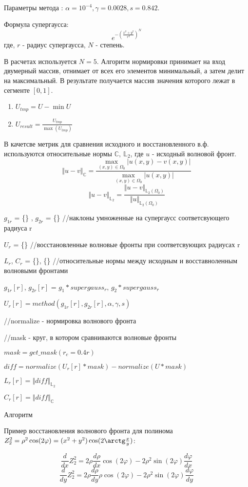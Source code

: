 \documentclass[oneside, final, 14pt]{article}
\begin{document}
Параметры метода : $\alpha = 10^{-4}, \gamma = 0.0028, s=0.842$.

Формула супергаусса:
$$
e^{-(\frac{x^2 + y^2}{r^2})^N}
$$
где, $r$ - радиус супергаусса, $N$ - степень.

В расчетах используется $N = 5$.
Алгоритм нормировки принимает на вход двумерный массив, отнимает от всех его элементов минимальный, а затем делит на максимальный. В результате получается массив значения которого лежат в сегменте $[0,1]$.


\begin{enumerate} 
 	\item $U_{tmp} = U - \min{U}$
   	\item $U_{result} = \frac{U_{tmp}}{\max(U_{tmp})}$
\end{enumerate}


В качетсве метрик для сравнения исходного и восстановленного в.ф. используются относительные нормы $\mathbb{C},\ \mathbb{L}_2$, где $u$ - исходный волновой фронт.
$$\Vert u - v\Vert_{\mathbb{C}} = \frac{\max\limits_{(x,y) \in \Omega_0} |u(x,y) - v(x,y)|}{\max\limits_{(x,y) \in \Omega_0} |u(x,y)|}$$
$$\Vert u - v\Vert_{\mathbb{L}_2} = \frac{\Vert u - v \Vert_{\mathbb{L}_2(\Omega_0)}}{\Vert u \Vert_{\mathbb{L}_2(\Omega_0)}}$$
\begin{algorithm}[H]
	$g_{1r}$ = \{\} , $g_{2r}$ = \{\} //наклоны умноженные на супергаусс соответсвующего радиуса r
	
	$U_r$ = \{\} //восстановленные волновые фронты при соответсвующих радиусах r
	
	$L_r$, $C_r$ = \{\}, \{\} //относительные нормы между исходным и восставноленным волновыми фронтами
	 
	 {
		$g_{1r}[r]$, $g_{2r}[r]$ = $g_1 * supergauss_r$, $g_2 * supergauss_r$
		
		$U_r[r] = method(g_{1r}[r],g_{2r}[r], \alpha, \gamma, s)$
		
		//normalize - нормировка волнового фронта
		
		//mask - круг, в котором сравниваются волновые фронты

		$mask = get\_mask(r_c = 0.4r)$
		
		$diff = normalize(U_r[r] * mask) - normalize(U * mask)$
		
		$L_r[r] = \Vert diff \Vert_{\mathbb{L}_2}$
		
		$C_r[r] = \Vert diff \Vert_{\mathbb{C}}$
	}
	\caption{Алгоритм}
\end{algorithm}
\begin{center}
Пример восстановления волнового фронта для полинома $Z_2^2 = \rho^2 \cos(2 \varphi) = (x^2 + y^2)\cos(2 \arctg\frac{x}{y} )$:
\end{center}
$$
\frac{d}{dx} Z_2^2 = 2 \rho \frac{d\rho}{dx}  \cos(2 \varphi) - 2\rho^2 \sin(2 \varphi) \frac{d\varphi}{dx} 
$$
$$
\frac{d}{dy} Z_2^2 = 2 \rho \frac{d\rho}{dy} \rho \cos(2 \varphi) - 2\rho^2 \sin(2 \varphi) \frac{d\varphi}{dy} 
$$
\end{document}
